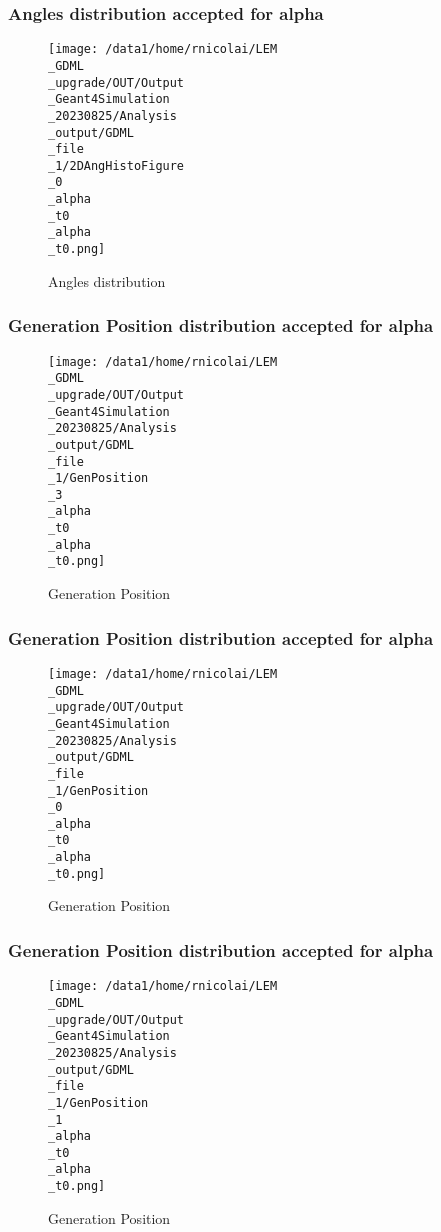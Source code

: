 \documentclass[8pt]{beamer}
\begin{document}
            \begin{frame}
                \frametitle{Angles distribution accepted for alpha}
            
        \begin{figure}[h]
            \centering
            \texttt{[image: /data1/home/rnicolai/LEM\\\_GDML\\\_upgrade/OUT/Output\\\_Geant4Simulation\\\_20230825/Analysis\\\_output/GDML\\\_file\\\_1/2DAngHistoFigure\\\_0\\\_alpha\\\_t0\\\_alpha\\\_t0.png]}
            \caption{Angles distribution}
        \end{figure}
        
            \end{frame}
            
            \begin{frame}
                \frametitle{Generation Position distribution accepted for alpha}
            
        \begin{figure}[h]
            \centering
            \texttt{[image: /data1/home/rnicolai/LEM\\\_GDML\\\_upgrade/OUT/Output\\\_Geant4Simulation\\\_20230825/Analysis\\\_output/GDML\\\_file\\\_1/GenPosition\\\_3\\\_alpha\\\_t0\\\_alpha\\\_t0.png]}
            \caption{Generation Position}
        \end{figure}
        
            \end{frame}
            
            \begin{frame}
                \frametitle{Generation Position distribution accepted for alpha}
            
        \begin{figure}[h]
            \centering
            \texttt{[image: /data1/home/rnicolai/LEM\\\_GDML\\\_upgrade/OUT/Output\\\_Geant4Simulation\\\_20230825/Analysis\\\_output/GDML\\\_file\\\_1/GenPosition\\\_0\\\_alpha\\\_t0\\\_alpha\\\_t0.png]}
            \caption{Generation Position}
        \end{figure}
        
            \end{frame}
            
            \begin{frame}
                \frametitle{Generation Position distribution accepted for alpha}
            
        \begin{figure}[h]
            \centering
            \texttt{[image: /data1/home/rnicolai/LEM\\\_GDML\\\_upgrade/OUT/Output\\\_Geant4Simulation\\\_20230825/Analysis\\\_output/GDML\\\_file\\\_1/GenPosition\\\_1\\\_alpha\\\_t0\\\_alpha\\\_t0.png]}
            \caption{Generation Position}
        \end{figure}
        
            \end{frame}
            
\end{document}
